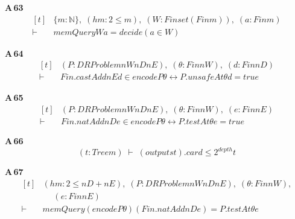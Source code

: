 \noindent\textbf{A\,63}\quad{}
{\footnotesize\[ \begin{aligned}[t]
&\{ \mathit{m} : \mathbb{N} \},\; (\mathit{hm} : 2 \leq \mathit{m}),\; (\mathit{W} : \mathit{Finset} (\mathit{Fin} \mathit{m})),\; (\mathit{a} : \mathit{Fin} \mathit{m})\\
\vdash\;&\mathit{memQuery} \mathit{W} \mathit{a} = \mathit{decide} (\mathit{a} \in \mathit{W})
\end{aligned} \]}

\noindent\textbf{A\,64}\quad{}
{\footnotesize\[ \begin{aligned}[t]
&(\mathit{P} : \mathit{DRProblem} \mathit{nW} \mathit{nD} \mathit{nE}),\; (\theta : \mathit{Fin} \mathit{nW}),\; (\mathit{d} : \mathit{Fin} \mathit{nD})\\
\vdash\;&\mathit{Fin}.\mathit{castAdd} \mathit{nE} \mathit{d} \in \mathit{encode} \mathit{P} \theta \leftrightarrow \mathit{P}.\mathit{unsafeAt} \theta \mathit{d} = \mathit{true}
\end{aligned} \]}

\noindent\textbf{A\,65}\quad{}
{\footnotesize\[ \begin{aligned}[t]
&(\mathit{P} : \mathit{DRProblem} \mathit{nW} \mathit{nD} \mathit{nE}),\; (\theta : \mathit{Fin} \mathit{nW}),\; (\mathit{e} : \mathit{Fin} \mathit{nE})\\
\vdash\;&\mathit{Fin}.\mathit{natAdd} \mathit{nD} \mathit{e} \in \mathit{encode} \mathit{P} \theta \leftrightarrow \mathit{P}.\mathit{testAt} \theta \mathit{e} = \mathit{true}
\end{aligned} \]}

\noindent\textbf{A\,66}\quad{}
{\footnotesize\[ (\mathit{t} : \mathit{Tree} \mathit{m}) \;\vdash\; (\mathit{outputs} \mathit{t}).\mathit{card} \leq 2 ^{\mathit{depth}} \mathit{t} \]}

\noindent\textbf{A\,67}\quad{}
{\footnotesize\[ \begin{aligned}[t]
&(\mathit{hm} : 2 \leq \mathit{nD} + \mathit{nE}),\; (\mathit{P} : \mathit{DRProblem} \mathit{nW} \mathit{nD} \mathit{nE}),\; (\theta : \mathit{Fin} \mathit{nW}),\\
&\quad \; (\mathit{e} : \mathit{Fin} \mathit{nE})\\
\vdash\;&\mathit{memQuery} (\mathit{encode} \mathit{P} \theta ) (\mathit{Fin}.\mathit{natAdd} \mathit{nD} \mathit{e}) = \mathit{P}.\mathit{testAt} \theta \mathit{e}
\end{aligned} \]}

